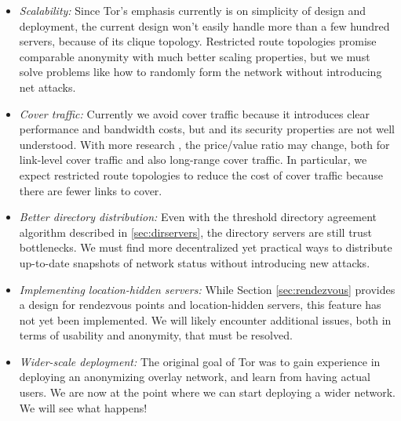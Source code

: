 \documentclass[times,10pt,twocolumn]{article}
\begin{document}
\begin{itemize}
\item \emph{Scalability:} Since Tor's emphasis currently is on simplicity
of design and deployment, the current design won't easily handle more
than a few hundred servers, because of its clique topology. Restricted
route topologies \cite{danezis:pet2003} promise comparable anonymity
with much better scaling properties, but we must solve problems like
how to randomly form the network without introducing net attacks.
\item \emph{Cover traffic:} Currently we avoid cover traffic because
it introduces clear performance and bandwidth costs, but and its
security properties are not well understood. With more research
\cite{SS03,defensive-dropping}, the price/value ratio may change, both for
link-level cover traffic and also long-range cover traffic. In particular,
we expect restricted route topologies to reduce the cost of cover traffic
because there are fewer links to cover.
\item \emph{Better directory distribution:} Even with the threshold
directory agreement algorithm described in \ref{sec:dirservers},
the directory servers are still trust bottlenecks. We must find more
decentralized yet practical ways to distribute up-to-date snapshots of
network status without introducing new attacks.
\item \emph{Implementing location-hidden servers:} While Section
\ref{sec:rendezvous} provides a design for rendezvous points and
location-hidden servers, this feature has not yet been implemented.
We will likely encounter additional issues, both in terms of usability
and anonymity, that must be resolved.
\item \emph{Wider-scale deployment:} The original goal of Tor was to
gain experience in deploying an anonymizing overlay network, and learn
from having actual users. We are now at the point where we can start
deploying a wider network. We will see what happens!
\end{itemize}






\end{document}
